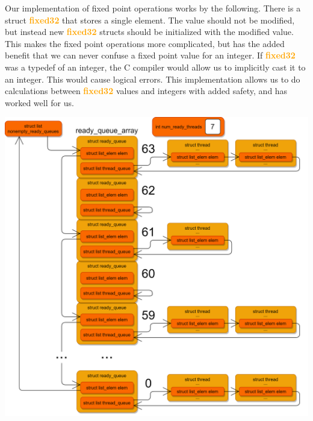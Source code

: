 \documentclass{report}
\newcommand{\struct}[1]{\textcolor{orange}{\textbf{#1}}}
\begin{document}
                Our implementation of fixed point operations works by the following. There is a struct \struct{fixed32} 
                that stores a single element. The value should not be modified, but instead new \struct{fixed32} structs 
                should be initialized with the modified value. This makes the fixed point operations more complicated, 
                but has the added benefit that we can never confuse a fixed point value for an integer. If \struct{fixed32} 
                was a typedef of an integer, the C compiler would allow us to implicitly cast it to an integer. This would 
                cause logical errors. This implementation allows us to do calculations between \struct{fixed32} values 
                and integers with added safety, and has worked well for us.
                
                \begin{center}
                    \includegraphics[width=\textwidth]{scheduler.png}
                \end{center}
\end{document}
